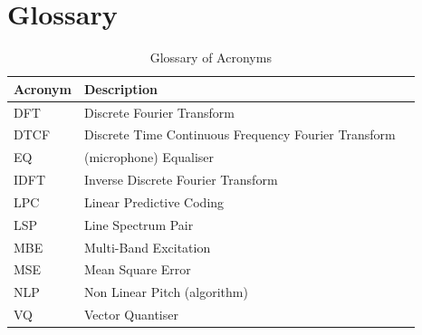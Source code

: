 \documentclass{article}
\begin{document}
\section{Glossary}
\label{sect:glossary}

\begin{table}[H]
\label{tab:acronyms}
\centering
\begin{tabular}{l l l }
\hline
Acronym & Description \\
\hline
DFT & Discrete Fourier Transform \\
DTCF & Discrete Time Continuous Frequency Fourier Transform \\
EQ & (microphone) Equaliser \\
IDFT & Inverse Discrete Fourier Transform \\
LPC & Linear Predictive Coding \\
LSP & Line Spectrum Pair \\
MBE & Multi-Band Excitation \\
MSE & Mean Square Error \\
NLP & Non Linear Pitch (algorithm) \\
VQ & Vector Quantiser \\
\hline
\end{tabular}
\caption{Glossary of Acronyms}
\end{table}
\end{document}
